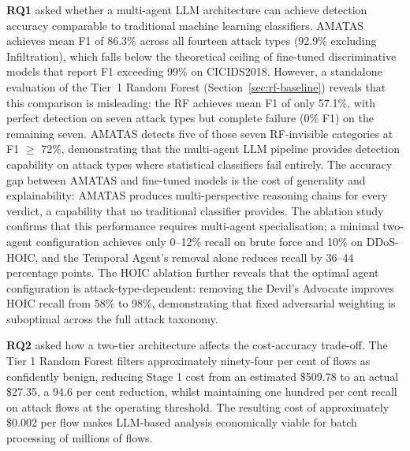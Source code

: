 \documentclass[../main.tex]{subfiles}
\begin{document}
\textbf{RQ1} asked whether a multi-agent LLM architecture can achieve detection accuracy comparable to traditional machine learning classifiers. AMATAS achieves mean F1 of 86.3\% across all fourteen attack types (92.9\% excluding Infiltration), which falls below the theoretical ceiling of fine-tuned discriminative models that report F1 exceeding 99\% on CICIDS2018. However, a standalone evaluation of the Tier~1 Random Forest (Section~\ref{sec:rf-baseline}) reveals that this comparison is misleading: the RF achieves mean F1 of only 57.1\%, with perfect detection on seven attack types but complete failure (0\% F1) on the remaining seven. AMATAS detects five of those seven RF-invisible categories at F1 $\geq$ 72\%, demonstrating that the multi-agent LLM pipeline provides detection capability on attack types where statistical classifiers fail entirely. The accuracy gap between AMATAS and fine-tuned models is the cost of generality and explainability: AMATAS produces multi-perspective reasoning chains for every verdict, a capability that no traditional classifier provides. The ablation study confirms that this performance requires multi-agent specialisation; a minimal two-agent configuration achieves only 0--12\% recall on brute force and 10\% on DDoS-HOIC, and the Temporal Agent's removal alone reduces recall by 36--44 percentage points. The HOIC ablation further reveals that the optimal agent configuration is attack-type-dependent: removing the Devil's Advocate improves HOIC recall from 58\% to 98\%, demonstrating that fixed adversarial weighting is suboptimal across the full attack taxonomy.

\textbf{RQ2} asked how a two-tier architecture affects the cost-accuracy trade-off. The Tier 1 Random Forest filters approximately ninety-four per cent of flows as confidently benign, reducing Stage 1 cost from an estimated \$509.78 to an actual \$27.35, a 94.6 per cent reduction, whilst maintaining one hundred per cent recall on attack flows at the operating threshold. The resulting cost of approximately \$0.002 per flow makes LLM-based analysis economically viable for batch processing of millions of flows.
\end{document}
